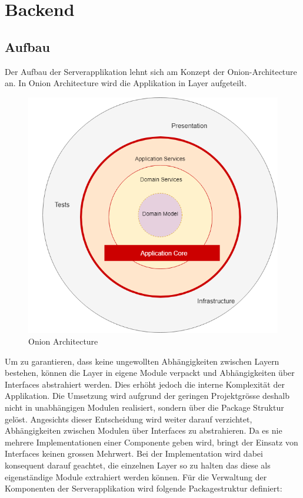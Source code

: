 \section{Backend}

\subsection{Aufbau}

Der Aufbau der Serverapplikation lehnt sich am Konzept der Onion-Architecture an.
In Onion Architecture wird die Applikation in Layer aufgeteilt.

\begin{figure}[h]
    \centering
    \begin{minipage}[b]{0.4\textwidth}
        \includegraphics[width=\textwidth]{graphics/thinktocode-onion}
        \caption{Onion Architecture}
    \end{minipage}
\end{figure}

Um zu garantieren, dass keine ungewollten Abhängigkeiten zwischen Layern bestehen, können die Layer in eigene Module verpackt und Abhängigkeiten über Interfaces abstrahiert werden.
Dies erhöht jedoch die interne Komplexität der Applikation.
Die Umsetzung wird aufgrund der geringen Projektgrösse deshalb nicht in unabhängigen Modulen realisiert, sondern über die Package Struktur gelöst.
Angesichts dieser Entscheidung wird weiter darauf verzichtet, Abhängigkeiten zwischen Modulen über Interfaces zu abstrahieren.
Da es nie mehrere Implementationen einer Componente geben wird, bringt der Einsatz von Interfaces keinen grossen Mehrwert.
Bei der Implementation wird dabei konsequent darauf geachtet, die einzelnen Layer so zu halten das diese als eigenständige Module extrahiert werden können.
Für die Verwaltung der Komponenten der Serverapplikation wird folgende Packagestruktur definiert:

